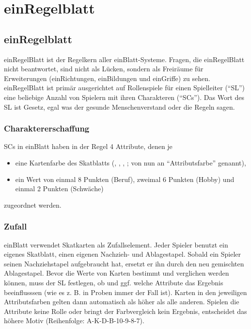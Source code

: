 \part {einRegelblatt}
\chapter {einRegelblatt}
einRegelBlatt ist der Regelkern aller einBlatt-Systeme. Fragen, die einRegelBlatt nicht beantwortet, sind nicht als Lücken, sondern als Freiräume für Erweiterungen (einRichtungen, einBildungen und einGriffe) zu sehen. einRegelBlatt ist primär ausgerichtet auf Rollenspiele für einen Spielleiter ("`SL"') eine beliebige Anzahl von Spielern mit ihren Charakteren ("`SCs"'). Das Wort des SL ist Gesetz, egal was der gesunde Menschenverstand oder die Regeln sagen.
\section{Charaktererschaffung}
SCs in einBlatt haben in der Regel 4 Attribute, denen je
\begin{itemize}
\item eine Kartenfarbe des Skatblatts (\kreuz, \pik, \karo, \herz; von nun an "`Attributsfarbe"' genannt),
\item ein Wert von einmal 8 Punkten (Beruf), zweimal 6 Punkten (Hobby) und einmal 2 Punkten (Schwäche)
\end{itemize}
zugeordnet werden. 
\section{Zufall}
einBlatt verwendet Skatkarten als Zufallselement. Jeder Spieler benutzt ein eigenes Skatblatt, einen eigenen Nachzieh- und Ablagestapel. Sobald ein Spieler seinen Nachziehstapel aufgebraucht hat, ersetzt er ihn durch den neu gemischten Ablagestapel. Bevor die Werte von Karten bestimmt und verglichen werden können, muss der SL festlegen, ob und ggf. welche Attribute das Ergebnis beeinflusssen (wie es z. B. in Proben immer der Fall ist). Karten in den jeweiligen Attributsfarben gelten dann automatisch als höher als alle anderen. Spielen die Attribute keine Rolle oder bringt der Farbvergleich kein Ergebnis, entscheidet das höhere Motiv (Reihenfolge: A-K-D-B-10-9-8-7).
